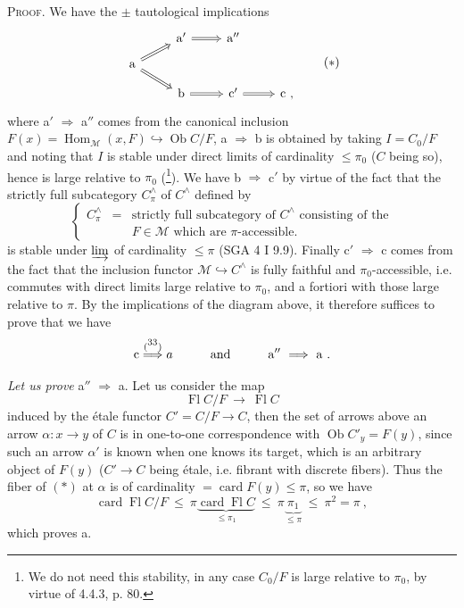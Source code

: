 \documentclass[11pt]{article}
\newcommand{\printedpage}[1]{\marginpar{\footnotesize p.~#1}}
\newcommand{\msp}[1]{\marginpar{\footnotesize [#1]}}
\newcommand{\card}{\operatorname{card}}
\newcommand{\Fl}{\operatorname{Fl}}
\newcommand{\Ob}{\operatorname{Ob}}
\newcommand{\Hom}{\operatorname{Hom}}
\begin{document}
\textsc{Proof}. We have the $\pm$ tautological implications
\[
\begin{tikzcd}[row sep=small]
 & \mathrm{a}' \arrow[r, Rightarrow] & \mathrm{a}'' & \\
\mathrm{a} \arrow[ur, Rightarrow] \arrow[dr, Rightarrow] & & & \\
 & \mathrm{b} \arrow[r, Rightarrow] & \mathrm{c}' \arrow[r, Rightarrow] & \mathrm{c}\ ,
\end{tikzcd}
\tag*{$(*)$}
\]
\printedpage{30}
where a$'$ $\Longrightarrow$ a$''$ comes from the canonical inclusion $F(x) = \Hom_{\mathcal{M}}(x,F) \hookrightarrow \Ob C/F$, a $\Longrightarrow$ b is obtained by taking $I = C_0/F$ and noting that $I$ is stable under direct limits of cardinality $\leqslant \pi_0$ ($C$ being so), hence is large relative to $\pi_0$ (\footnote{We do not need this stability, in any case $C_0/F$ is large relative to $\pi_0$, by virtue of 4.4.3, p. 80.}). We have b $\Longrightarrow$ c$'$ by virtue of the fact that the strictly full subcategory $C^{\wedge}_{\pi}$ of $C^{\wedge}$ defined by
\[
\left\{
\begin{array}{lcl}
C^{\wedge}_{\pi} & = & \text{strictly full subcategory of } C^{\wedge} \text{ consisting of the}\\
 & & F \in \mathcal{M} \text{ which are } \pi\text{-accessible.}
\end{array}
\right.
\tag*{(4.5.2.2)}
\]
is stable under $\varinjlim$ of cardinality $\leqslant \pi$ (SGA 4 I 9.9). Finally c$'$ $\Longrightarrow$ c comes from the fact that the inclusion functor $\mathcal{M} \hookrightarrow C^{\wedge}$ is fully faithful and $\pi_0$-accessible, i.e. commutes with direct limits large relative to $\pi_0$, and a fortiori with those large relative to $\pi$. By the implications of the diagram above, it therefore suffices to prove that we have
\[
\mathrm{c} \overset{(\mbox{\footnotemark[33]})}{\Longrightarrow} a \qquad\quad \text{and} \qquad\quad \mathrm{a}'' \ \Longrightarrow\ \mathrm{a}\ .
\]
\setcounter{footnote}{33}

\msp{page 109}

\textit{Let us prove} a$''$ $\Longrightarrow$ a. Let us consider the map
\[
\Fl C/F \ \longrightarrow\ \Fl C
\tag*{$(*)$}
\]
induced by the étale functor $C' = C/F \longrightarrow C$, then the set of arrows above an %
arrow $\alpha : x \longrightarrow y$ of $C$ is in one-to-one correspondence with $\Ob C'_y = F(y)$, since such an arrow $\alpha'$ is known when one knows its target, which is an arbitrary object of $F(y)$ ($C' \longrightarrow C$ being étale, i.e. fibrant with discrete fibers). Thus the fiber of $(*)$ at $\alpha$ is of %
cardinality $= \card F(y) \leqslant \pi$, so we have
\[
\card\Fl C/F \ \leqslant\ \pi \underbrace{\card\Fl C}_{\leqslant \pi_1} \ \leqslant\ \pi \underbrace{\ \pi_1\ }_{\leqslant \pi} \ \leqslant\ \pi^2 = \pi\ ,
\]
which proves a.
\end{document}
